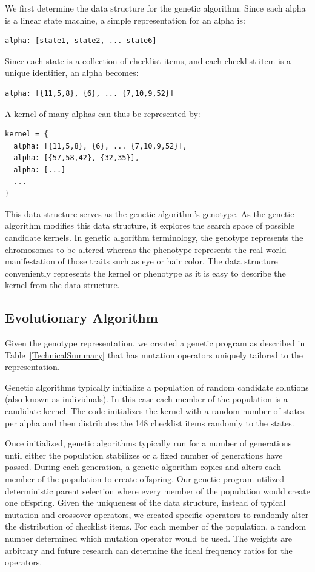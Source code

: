 \documentclass[preprint,12pt,3p]{elsarticle}
\begin{document}
We first determine the data structure for the genetic algorithm. Since each alpha is a linear state machine, a simple representation for an alpha is: 
\begin{verbatim}
alpha: [state1, state2, ... state6] 
\end{verbatim}

Since each state is a collection of checklist items, and each checklist item is a unique identifier, an alpha becomes:

\begin{verbatim}
alpha: [{11,5,8}, {6}, ... {7,10,9,52}]
\end{verbatim}

A kernel of many alphas can thus be represented by:

\begin{verbatim}
kernel = {
  alpha: [{11,5,8}, {6}, ... {7,10,9,52}],
  alpha: [{57,58,42}, {32,35}],
  alpha: [...]
  ...
}
\end{verbatim}

This data structure serves as the genetic algorithm's genotype. As the genetic algorithm modifies this data structure, it explores the search space of possible candidate kernels. In genetic algorithm terminology, the genotype represents the chromosomes to be altered whereas the phenotype represents the real world manifestation of those traits such as eye or hair color. The data structure conveniently represents the kernel or phenotype as it is easy to describe the kernel from the data structure.\cite{Eiben2003} 

\subsection{Evolutionary Algorithm}
\label{Evolutionary Algorithm}

Given the genotype representation, we created a genetic program as described in Table~\ref{TechnicalSummary} that has mutation operators uniquely tailored to the representation.

Genetic algorithms typically initialize a population of random candidate solutions (also known as individuals). In this case each member of the population is a candidate kernel. The code initializes the kernel with a random number of states per alpha and then distributes the 148 checklist items randomly to the states. 

Once initialized, genetic algorithms typically run for a number of generations until either the population stabilizes or a fixed number of generations have passed. During each generation, a genetic algorithm copies and alters each member of the population to create offspring. Our genetic program utilized deterministic parent selection where every member of the population would create one offspring. Given the uniqueness of the data structure, instead of typical mutation and crossover operators, we created specific operators to randomly alter the distribution of checklist items. For each member of the population, a random number determined which mutation operator would be used. The weights are arbitrary and future research can determine the ideal frequency ratios for the operators.
\end{document}
